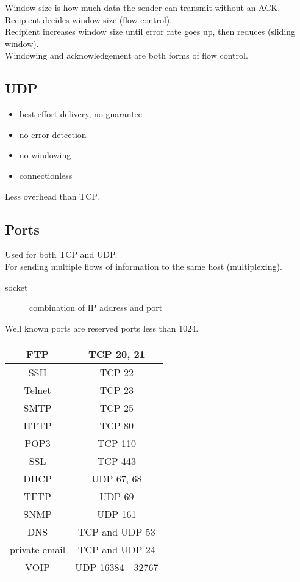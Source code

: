Window size is how much data the sender can transmit without an ACK.\\

Recipient decides window size (flow control).\\

Recipient increases window size until error rate goes up, then reduces (sliding
window).\\

Windowing and acknowledgement are both forms of flow control.

\subsection{UDP}

\begin{itemize}

\item best effort delivery, no guarantee
\item no error detection
\item no windowing
\item connectionless

\end{itemize}

Less overhead than TCP.

\subsection{Ports}

Used for both TCP and UDP.\\

For sending multiple flows of information to the same host (multiplexing).

\begin{description}

\item[socket]
combination of IP address and port

\end{description}

Well known ports are reserved ports less than 1024.\\

\begin{tabular}{ | c | c | }
\hline
FTP & TCP 20, 21 \\ \hline
SSH & TCP 22 \\ \hline
Telnet & TCP 23 \\ \hline
SMTP & TCP 25 \\ \hline
HTTP & TCP 80 \\ \hline
POP3 & TCP 110 \\ \hline
SSL & TCP 443 \\ \hline
\hline
DHCP & UDP 67, 68 \\ \hline
TFTP & UDP 69 \\ \hline
SNMP & UDP 161 \\ \hline
\hline
DNS & TCP and UDP 53 \\ \hline
private email & TCP and UDP 24 \\ \hline
\hline
VOIP & UDP 16384 - 32767 \\ \hline
\end{tabular}
